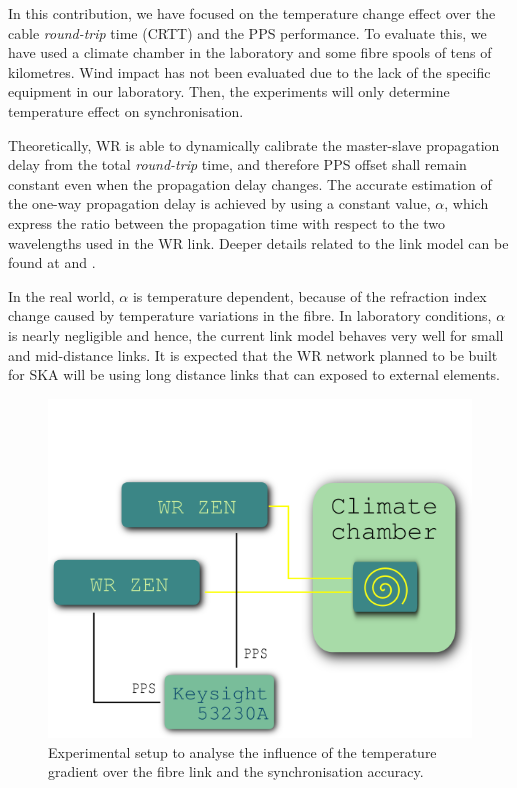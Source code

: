 In this contribution, we have focused on the temperature change effect over the 
cable \textit{round-trip} time (CRTT) and the PPS performance. To evaluate this, we have used a climate chamber in the laboratory and some fibre spools of tens of kilometres. Wind impact has not been evaluated due to the lack of the specific equipment in our laboratory. Then, the experiments will only determine temperature effect on synchronisation.

Theoretically, WR is able to dynamically calibrate the master-slave 
propagation delay from the total \textit{round-trip} time, and therefore PPS 
offset shall remain constant even when the propagation delay changes. The 
accurate estimation of the one-way propagation delay is achieved by using 
a constant value, $\alpha$, which express the ratio between the propagation time 
with respect to the two wavelengths used in the WR link. Deeper details related to the 
link model can be found at \cite{Wlostowski2011} and \cite{Daniluk2012}.

In the real world, $\alpha$ is temperature dependent, because of the 
refraction index change caused by temperature variations in the fibre.
In laboratory conditions, $\alpha$ is nearly negligible and hence,
the current link model behaves very well for small and mid-distance links. 
It is expected that the WR network planned to be built for SKA will be using long distance
links that can exposed to external elements. 


\begin{figure}
	\centering
	\includegraphics[width=0.7\linewidth]{img/tempsetup}
	\caption[Configuration of the climate chamber experiments]{Experimental 
		setup to analyse the influence of the temperature gradient over the 
		fibre link and the synchronisation accuracy.}
	\label{fig:tempsetup}
\end{figure}

